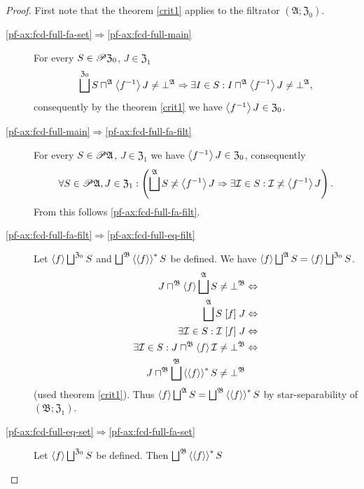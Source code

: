 \begin{proof}
First note that the theorem \ref{crit1} applies to the filtrator
$(\mathfrak{A};\mathfrak{Z}_{0})$.
\begin{description}
\item [{\ref{pf-ax:fcd-full-fa-set}$\Rightarrow$\ref{pf-ax:fcd-full-main}}] For
every $S\in\mathscr{P}\mathfrak{Z}_{0}$, $J\in\mathfrak{Z}_{1}$ 
\begin{equation}
\bigsqcup^{\mathfrak{Z}_{0}}S\sqcap^{\mathfrak{A}}\left\langle f^{-1}\right\rangle J\neq\bot^{\mathfrak{A}}\Rightarrow\exists I\in S:I\sqcap^{\mathfrak{A}}\left\langle f^{-1}\right\rangle J\neq\bot^{\mathfrak{A}},\label{eq:fcd-full-ee}
\end{equation}
consequently by the theorem \ref{crit1} we have $\left\langle f^{-1}\right\rangle J\in\mathfrak{Z}_{0}$.
\item [{\ref{pf-ax:fcd-full-main}$\Rightarrow$\ref{pf-ax:fcd-full-fa-filt}}] For
every $S\in\mathscr{P}\mathfrak{A}$, $J\in\mathfrak{Z}_{1}$ we have
$\left\langle f^{-1}\right\rangle J\in\mathfrak{Z}_{0}$, consequently 
\[
\forall S\in\mathscr{P}\mathfrak{A},J\in\mathfrak{Z}_{1}:\left(\bigsqcup^{\mathfrak{A}}S\not\asymp\left\langle f^{-1}\right\rangle J\Rightarrow\exists\mathcal{I}\in S:\mathcal{I}\not\asymp\left\langle f^{-1}\right\rangle J\right).
\]
From this follows \ref{pf-ax:fcd-full-fa-filt}.
\item [{\ref{pf-ax:fcd-full-fa-filt}$\Rightarrow$\ref{pf-ax:fcd-full-eq-filt}}] Let
$\left\langle f\right\rangle\bigsqcup^{\mathfrak{Z}_{0}}S$ and $\bigsqcup^{\mathfrak{B}}\left\langle \left\langle f\right\rangle\right\rangle ^{\ast}S$
be defined. We have $\left\langle f\right\rangle\bigsqcup^{\mathfrak{A}}S=\left\langle f\right\rangle\bigsqcup^{\mathfrak{Z}_{0}}S$.
\begin{align*}
J\sqcap^{\mathfrak{B}}\left\langle f\right\rangle\bigsqcup^{\mathfrak{A}}S\ne\bot^{\mathfrak{B}} & \Leftrightarrow\\
\bigsqcup^{\mathfrak{A}}S\mathrel{\left[f\right]}J & \Leftrightarrow\\
\exists\mathcal{I}\in S:\mathcal{I}\mathrel{\left[f\right]}J & \Leftrightarrow\\
\exists\mathcal{I}\in S:J\sqcap^{\mathfrak{B}}\left\langle f\right\rangle\mathcal{I}\ne\bot^{\mathfrak{B}} & \Leftrightarrow\\
J\sqcap^{\mathfrak{B}}\bigsqcup^{\mathfrak{B}}\left\langle \left\langle f\right\rangle\right\rangle ^{\ast}S\ne\bot^{\mathfrak{B}}
\end{align*}
(used theorem \ref{crit1}). Thus $\left\langle f\right\rangle\bigsqcup^{\mathfrak{A}}S=\bigsqcup^{\mathfrak{B}}\left\langle \left\langle f\right\rangle\right\rangle ^{\ast}S$
by star-separability of $(\mathfrak{B};\mathfrak{Z}_{1})$.
\item [{\ref{pf-ax:fcd-full-eq-set}$\Rightarrow$\ref{pf-ax:fcd-full-fa-set}}] Let
$\left\langle f\right\rangle\bigsqcup^{\mathfrak{Z}_{0}}S$ be defined. Then $\bigsqcup^{\mathfrak{B}}\left\langle \left\langle f\right\rangle\right\rangle ^{\ast}S$

\end{description}
\end{proof}
